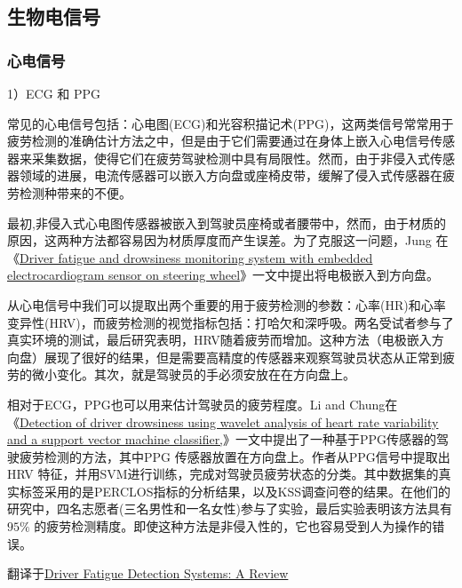 \subsection{生物电信号}

\subsubsection{心电信号}

1）ECG 和 PPG

常见的心电信号包括：心电图(ECG)和光容积描记术(PPG)，这两类信号常常用于疲劳检测的准确估计方法之中，但是由于它们需要通过在身体上嵌入心电信号传感器来采集数据，使得它们在疲劳驾驶检测中具有局限性。然而，由于非侵入式传感器领域的进展，电流传感器可以嵌入方向盘或座椅皮带，缓解了侵入式传感器在疲劳检测种带来的不便。

最初,非侵入式心电图传感器被嵌入到驾驶员座椅或者腰带中，然而，由于材质的原因，这两种方法都容易因为材质厚度而产生误差。为了克服这一问题，Jung 在《\href{https://xueshu.baidu.com/usercenter/paper/show?paperid=bd19bce061c995470f2f5df1beef2481&site=xueshu_se&hitarticle=1}{Driver fatigue and drowsiness monitoring system with embedded electrocardiogram sensor on steering wheel}》一文中提出将电极嵌入到方向盘。

从心电信号中我们可以提取出两个重要的用于疲劳检测的参数：心率(HR)和心率变异性(HRV)，而疲劳检测的视觉指标包括：打哈欠和深呼吸。两名受试者参与了真实环境的测试，最后研究表明，HRV随着疲劳而增加。这种方法（电极嵌入方向盘）展现了很好的结果，但是需要高精度的传感器来观察驾驶员状态从正常到疲劳的微小变化。其次，就是驾驶员的手必须安放在在方向盘上。

相对于ECG，PPG也可以用来估计驾驶员的疲劳程度。Li and Chung在《\href{https://xueshu.baidu.com/usercenter/paper/show?paperid=ff6ce7a5353e5830f88f2ef24de4a947&site=xueshu_se}{Detection of driver drowsiness using wavelet analysis of heart rate variability and a support vector machine classifier,}》一文中提出了一种基于PPG传感器的驾驶疲劳检测的方法，其中PPG 传感器放置在方向盘上。作者从PPG信号中提取出HRV 特征，并用SVM进行训练，完成对驾驶员疲劳状态的分类。其中数据集的真实标签采用的是PERCLOS指标的分析结果，以及KSS调查问卷的结果。在他们的研究中，四名志愿者(三名男性和一名女性)参与了实验，最后实验表明该方法具有$95\%$ 的疲劳检测精度。即使这种方法是非侵入性的，它也容易受到人为操作的错误。

翻译于\href{https://xueshu.baidu.com/usercenter/paper/show?paperid=1r7a06p0ve7m08y0s32w0jq04r498130&site=xueshu_se}{Driver Fatigue Detection Systems: A Review}

